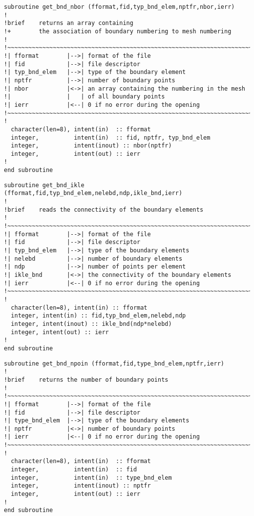%
\begin{lstlisting}
subroutine get_bnd_nbor (fformat,fid,typ_bnd_elem,nptfr,nbor,ierr)
!
!brief    returns an array containing 
!+        the association of boundary numbering to mesh numbering
!
!~~~~~~~~~~~~~~~~~~~~~~~~~~~~~~~~~~~~~~~~~~~~~~~~~~~~~~~~~~~~~~~~~~~~~~~
!| fformat        |-->| format of the file
!| fid            |-->| file descriptor
!| typ_bnd_elem   |-->| type of the boundary element
!| nptfr          |-->| number of boundary points
!| nbor           |<->| an array containing the numbering in the mesh 
!|                |   | of all boundary points
!| ierr           |<--| 0 if no error during the opening
!~~~~~~~~~~~~~~~~~~~~~~~~~~~~~~~~~~~~~~~~~~~~~~~~~~~~~~~~~~~~~~~~~~~~~~~
!
  character(len=8), intent(in)  :: fformat
  integer,          intent(in)  :: fid, nptfr, typ_bnd_elem
  integer,          intent(inout) :: nbor(nptfr)
  integer,          intent(out) :: ierr
!
end subroutine
\end{lstlisting}
%
\begin{lstlisting}
subroutine get_bnd_ikle (fformat,fid,typ_bnd_elem,nelebd,ndp,ikle_bnd,ierr)
!
!brief    reads the connectivity of the boundary elements
!
!~~~~~~~~~~~~~~~~~~~~~~~~~~~~~~~~~~~~~~~~~~~~~~~~~~~~~~~~~~~~~~~~~~~~~~~
!| fformat        |-->| format of the file
!| fid            |-->| file descriptor
!| typ_bnd_elem   |-->| type of the boundary elements
!| nelebd         |-->| number of boundary elements
!| ndp            |-->| number of points per element
!| ikle_bnd       |<->| the connectivity of the boundary elements
!| ierr           |<--| 0 if no error during the opening
!~~~~~~~~~~~~~~~~~~~~~~~~~~~~~~~~~~~~~~~~~~~~~~~~~~~~~~~~~~~~~~~~~~~~~~~
!
  character(len=8), intent(in) :: fformat
  integer, intent(in) :: fid,typ_bnd_elem,nelebd,ndp
  integer, intent(inout) :: ikle_bnd(ndp*nelebd)
  integer, intent(out) :: ierr
!
end subroutine
\end{lstlisting}
%
\begin{lstlisting}
subroutine get_bnd_npoin (fformat,fid,type_bnd_elem,nptfr,ierr)
!
!brief    returns the number of boundary points
!
!~~~~~~~~~~~~~~~~~~~~~~~~~~~~~~~~~~~~~~~~~~~~~~~~~~~~~~~~~~~~~~~~~~~~~~~
!| fformat        |-->| format of the file
!| fid            |-->| file descriptor
!| type_bnd_elem  |-->| type of the boundary elements
!| nptfr          |<->| number of boundary points
!| ierr           |<--| 0 if no error during the opening
!~~~~~~~~~~~~~~~~~~~~~~~~~~~~~~~~~~~~~~~~~~~~~~~~~~~~~~~~~~~~~~~~~~~~~~~
!
  character(len=8), intent(in)  :: fformat
  integer,          intent(in)  :: fid
  integer,          intent(in)  :: type_bnd_elem
  integer,          intent(inout) :: nptfr
  integer,          intent(out) :: ierr
!
end subroutine
\end{lstlisting}
